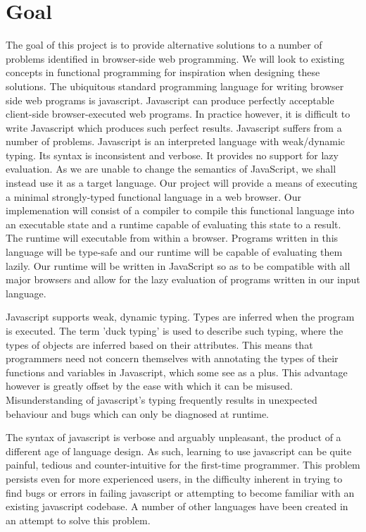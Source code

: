 
\section*{Goal}
The goal of this project is to provide alternative solutions to a number of problems
identified in browser-side web programming. We will look to existing concepts in 
functional programming for inspiration when designing these solutions. The ubiquitous 
standard programming language for writing browser side web programs is javascript. 
Javascript can produce 
perfectly acceptable client-side browser-executed web programs. In practice however, 
it is difficult to write Javascript which produces such perfect results. Javascript 
suffers from a number of problems. Javascript is an
interpreted language with weak/dynamic typing. Its syntax is inconsistent and verbose.
It provides no support for lazy evaluation. As we are unable to change the semantics
of JavaScript, we shall instead use it as a target language. Our project will 
provide a means of executing a minimal strongly-typed functional language in a web
browser. Our implemenation will consist of a compiler to 
compile this functional language into an executable state and a runtime capable of 
evaluating this state to a result. The runtime will executable from within a browser.
Programs written in this language will be type-safe and our runtime will be capable
of evaluating them lazily. Our runtime will be written in JavaScript so as to be 
compatible with all major browsers and allow for the lazy evaluation of programs
written in our input language.

Javascript supports weak, dynamic typing. Types are inferred when the program is
executed. The term 'duck typing' is used to describe such typing, where the types
of objects are inferred based on their attributes. This means that programmers need
not concern themselves with annotating the types of their functions and variables in
Javascript, which some see as a plus. This advantage however is greatly offset by
the ease with which it can be misused. Misunderstanding of javascript's typing 
frequently results in unexpected behaviour and bugs which can only be diagnosed at
runtime. 

The syntax of javascript is verbose and arguably unpleasant, the product of a different
age of language design. As such, learning to use javascript can be quite painful, tedious
and counter-intuitive for the first-time programmer. This problem persists even for
more experienced users, in the difficulty inherent in trying to find bugs or errors in
failing javascript or attempting to become familiar with an existing javascript codebase.
A number of other languages have been created in an attempt to solve this problem.

